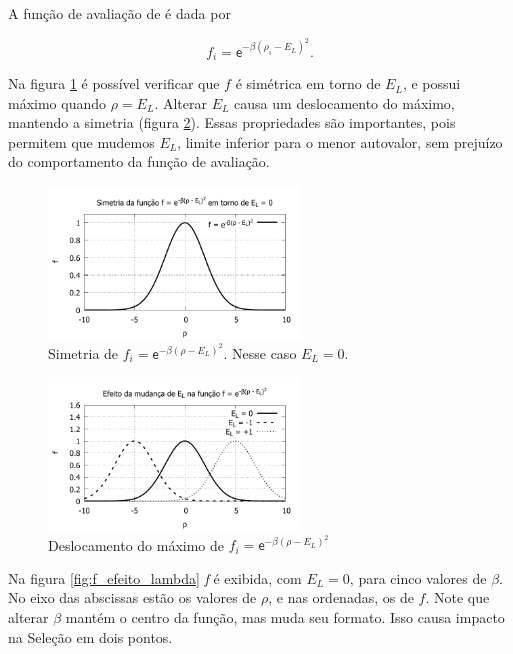 	A função de avaliação de \cite{metodo2011} é dada por
	
	\begin{equation}\label{eq:f_empirica}
		f_i = \mathsf{e}^{- \beta (\rho_i - 	E_L) ^2}.
	\end{equation}
	
	Na figura \ref{fig:f_simetrico} é possível verificar que $f$ é simétrica em torno de $E_L$, e possui máximo quando $\rho = E_L$. Alterar $E_L$ causa um deslocamento do máximo, mantendo a simetria (figura \ref{fig:f_deslocamento}). Essas propriedades são importantes, pois permitem que mudemos $E_L$, limite inferior para o menor autovalor, sem prejuízo do comportamento da função de avaliação.
	
	\begin{figure}[h]
		\centering
			\includegraphics[width=0.60\textwidth]{figs/resultados/precisaoFitness/f_simetrico.pdf}
		\caption{Simetria de $f_i = \mathsf{e}^{-\beta(\rho - E_L)^2}$. Nesse caso $E_L = 0$.}
		\label{fig:f_simetrico}
	\end{figure}
	
	\begin{figure}[h]
		\centering
			\includegraphics[width=0.60\textwidth]{figs/resultados/precisaoFitness/f_simetrico_outros.pdf}
		\caption{Deslocamento do máximo de $f_i = \mathsf{e}^{-\beta(\rho - E_L)^2}$}
		\label{fig:f_deslocamento}
	\end{figure}
	
	Na figura \ref{fig:f_efeito_lambda} \emph{f} é exibida, com $E_L = 0$, para cinco valores de $\beta$. No eixo das abscissas estão os valores de $\rho$, e nas ordenadas, os de $f$. Note que alterar $\beta$ mantém o centro da função, mas muda seu formato. Isso causa impacto na Seleção em dois pontos.
	
